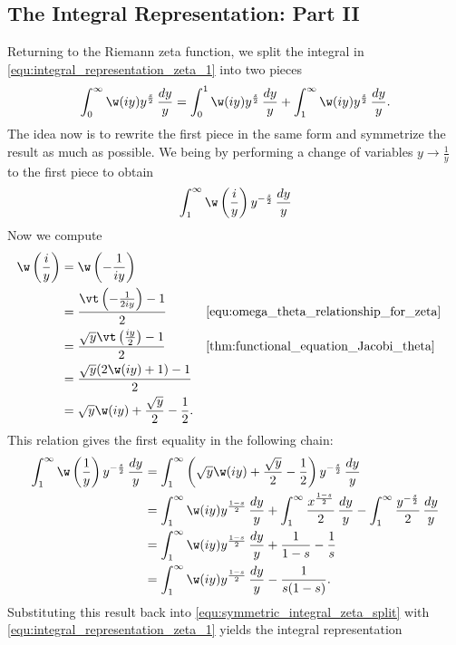     \subsection*{The Integral Representation: Part II}
      Returning to the Riemann zeta function, we split the integral in \cref{equ:integral_representation_zeta_1} into two pieces
      \begin{equation}\label{equ:symmetric_integral_zeta_split}
        \int_{0}^{\infty}\w(iy)y^{\frac{s}{2}}\,\frac{dy}{y} = \int_{0}^{1}\w(iy)y^{\frac{s}{2}}\,\frac{dy}{y}+\int_{1}^{\infty}\w(iy)y^{\frac{s}{2}}\,\frac{dy}{y}.
      \end{equation}
      The idea now is to rewrite the first piece in the same form and symmetrize the result as much as possible. We being by performing a change of variables $y \to \frac{1}{y}$ to the first piece to obtain
      \[
        \int_{1}^{\infty}\w\left(\frac{i}{y}\right)y^{-\frac{s}{2}}\,\frac{dy}{y}
      \]
      Now we compute
      \begin{align*}
        \w\left(\frac{i}{y}\right) &= \w\left(-\frac{1}{iy}\right) \\
        &= \frac{\vt\left(-\frac{1}{2iy}\right)-1}{2} && \text{\cref{equ:omega_theta_relationship_for_zeta}}\\
        &= \frac{\sqrt{y}\vt\left(\frac{iy}{2}\right)-1}{2} && \text{\cref{thm:functional_equation_Jacobi_theta}} \\
        &= \frac{\sqrt{y}(2\w(iy)+1)-1}{2} \\
        &= \sqrt{y}\w(iy)+\frac{\sqrt{y}}{2}-\frac{1}{2}.
      \end{align*}
      This relation gives the first equality in the following chain:
      \begin{align*}
        \int_{1}^{\infty}\w\left(\frac{1}{y}\right)y^{-\frac{s}{2}}\,\frac{dy}{y} &= \int_{1}^{\infty}\left(\sqrt{y}\w(iy)+\frac{\sqrt{y}}{2}-\frac{1}{2}\right)y^{-\frac{s}{2}}\,\frac{dy}{y} \\
        &= \int_{1}^{\infty}\w(iy)y^{\frac{1-s}{2}}\,\frac{dy}{y}+\int_{1}^{\infty}\frac{x^{\frac{1-s}{2}}}{2}\,\frac{dy}{y}-\int_{1}^{\infty}\frac{y^{-\frac{s}{2}}}{2}\,\frac{dy}{y} \\
        &= \int_{1}^{\infty}\w(iy)y^{\frac{1-s}{2}}\,\frac{dy}{y}+\frac{1}{1-s}-\frac{1}{s} \\
        &= \int_{1}^{\infty}\w(iy)y^{\frac{1-s}{2}}\,\frac{dy}{y}-\frac{1}{s(1-s)}.
      \end{align*}
      Substituting this result back into \cref{equ:symmetric_integral_zeta_split} with \cref{equ:integral_representation_zeta_1} yields the integral representation
